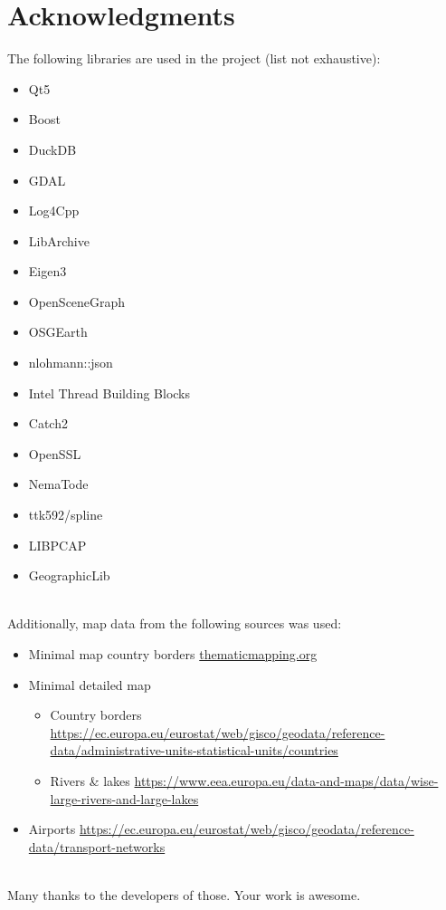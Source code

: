  \section{Acknowledgments}

The following libraries are used in the project (list not exhaustive):

\begin{itemize}  
\item Qt5
\item Boost
\item DuckDB
\item GDAL
\item Log4Cpp
\item LibArchive
\item Eigen3
\item OpenSceneGraph
\item OSGEarth
\item nlohmann::json
\item Intel Thread Building Blocks
\item Catch2
\item OpenSSL
\item NemaTode
\item ttk592/spline
\item LIBPCAP
\item GeographicLib
\end{itemize}
\ \\

Additionally, map data from the following sources was used:
\begin{itemize}  
\item Minimal map country borders \url{thematicmapping.org}
\item Minimal detailed map
\begin{itemize} 
\item Country borders \url{https://ec.europa.eu/eurostat/web/gisco/geodata/reference-data/administrative-units-statistical-units/countries}
\item Rivers \& lakes \url{https://www.eea.europa.eu/data-and-maps/data/wise-large-rivers-and-large-lakes}
\end{itemize}
\item Airports \url{https://ec.europa.eu/eurostat/web/gisco/geodata/reference-data/transport-networks}
\end{itemize}
\ \\

Many thanks to the developers of those. Your work is awesome.

